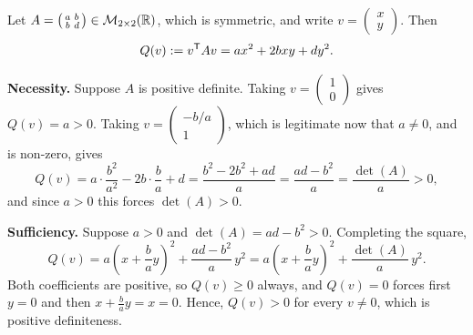 \begin{exercisesolution}
\label{sol:pos_def_examples_real_b}
  Let $A = \left(\begin{smallmatrix} a & b \\ b & d \end{smallmatrix}\right) \in \mathcal{M}_{2 \times 2}(\mathbb{R})$, which is symmetric, and write $v = \left(\begin{smallmatrix} x \\ y \end{smallmatrix}\right)$. Then
  \[ Q(v) := v^{\mathsf{T}} A v = a x^2 + 2bxy + d y^2. \]

  \textbf{Necessity.} Suppose $A$ is positive definite. Taking $v = \left(\begin{smallmatrix} 1 \\ 0 \end{smallmatrix}\right)$ gives $Q(v) = a > 0$. Taking $v = \left(\begin{smallmatrix} -b/a \\ 1 \end{smallmatrix}\right)$, which is legitimate now that $a \ne 0$, and is non-zero, gives
  \[ Q(v) = a \cdot \frac{b^2}{a^2} - 2b \cdot \frac{b}{a} + d = \frac{b^2 - 2b^2 + ad}{a} = \frac{ad - b^2}{a} = \frac{\det(A)}{a} > 0, \]
  and since $a > 0$ this forces $\det(A) > 0$.

  \textbf{Sufficiency.} Suppose $a > 0$ and $\det(A) = ad - b^2 > 0$. Completing the square,
  \begin{equation} \label{eq:complete_square_real}
    Q(v) = a \left( x + \frac{b}{a} y \right)^2 + \frac{ad - b^2}{a} \, y^2 = a \left( x + \frac{b}{a} y \right)^2 + \frac{\det(A)}{a} \, y^2 .
  \end{equation}
  Both coefficients are positive, so $Q(v) \ge 0$ always, and $Q(v) = 0$ forces first $y = 0$ and then $x + \frac{b}{a}y = x = 0$. Hence, $Q(v) > 0$ for every $v \ne 0$, which is positive definiteness.
\end{exercisesolution}

